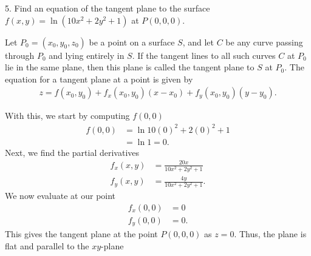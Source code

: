 \documentclass{report}
\begin{document}
    \bigbreak \noindent 
    \begin{mdframed}
        5. Find an equation of the tangent plane to the surface $f(x, y)=\ln \left(10 x^2+2 y^2+1\right)$ at $P(0,0,0)$.
    \end{mdframed}
    \bigbreak \noindent 
    \begin{remark}
        Let $P_0=(x_0,y_0,z_0)$ be a point on a surface $S$, and let $C$ be any curve passing through $P_0$ and lying entirely in $S$. If the tangent lines to all such curves $C$ at $P_0$ lie in the same plane, then this plane is called the tangent plane to $S$ at $P_0$.
        \bigbreak \noindent 
        The equation for a tangent plane at a point is given by
        \begin{align*}
            z = f(x_{0}, y_{0}) + f_{x}(x_{0}, y_{0})(x-x_{0}) + f_{y}(x_{0}, y_{0})(y-y_{0})
        .\end{align*}
    \end{remark}
    \bigbreak \noindent 
    With this, we start by computing $f(0,0)$
    \begin{align*}
        f(0,0) &= \ln{10(0)^{2} + 2(0)^{2} + 1} \\
        &=\ln{1} = 0
    .\end{align*}
    \bigbreak \noindent 
    Next, we find the partial derivatives
    \begin{align*}
        f_{x}(x,y) &= \frac{20x}{10x^{2} + 2y^{2} +1} \\
        f_{y}(x,y) &= \frac{4y}{10x^{2} + 2y^{2}  +1}
    .\end{align*}
    \bigbreak \noindent 
    We now evaluate at our point
    \begin{align*}
        f_{x}(0,0) &= 0 \\
        f_{y}(0,0) &= 0
    .\end{align*}
    \bigbreak \noindent 
    This gives the tangent plane at the point $P(0,0,0)$  as $z=0$. Thus, the plane is flat and parallel to the $xy$-plane
    
\end{document}
